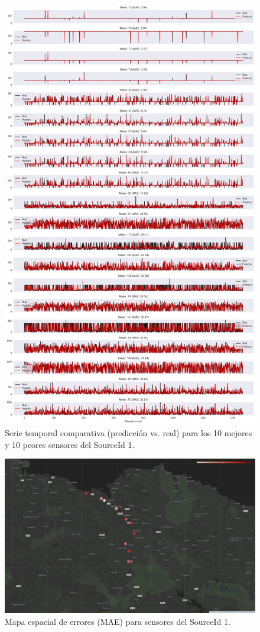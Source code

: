 \begin{figure}[H]
	\centering
	\includegraphics[width=0.75\linewidth]{includes/cap5/graphs/advanced/sid1_10best_10worst_meter_time_series.png}
	\caption{Serie temporal comparativa (predicción vs. real) para los 10 mejores y 10 peores sensores del SourceId 1.}
	\label{fig:sid1_timeseries_best_worst}
\end{figure}

\begin{figure}[H]
	\centering
	\includegraphics[width=0.9\linewidth]{includes/cap5/graphs/advanced/sid1_meters_error_rate_map.png}
	\caption{Mapa espacial de errores (MAE) para sensores del SourceId 1.}
	\label{fig:sid1_error_map}
\end{figure}

